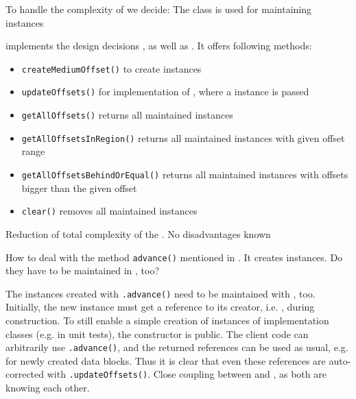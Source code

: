 To handle the complexity of \IMediumStore{} we decide:
{%
The class \MediumReferenceRepository{} is used for maintaining \IMediumReference{} instances
}
{%
\MediumReferenceRepository{} implements the design decisions ,  as well as . It offers following methods:
\begin{itemize}
\item \texttt{createMediumOffset()} to create \IMediumReference{} instances
\item \texttt{updateOffsets()} for implementation of , where a \MediumAction{} instance is passed
\item \texttt{getAllOffsets()} returns all maintained instances
\item \texttt{getAllOffsetsInRegion()} returns all maintained instances with given offset range
\item \texttt{getAllOffsetsBehindOrEqual()} returns all maintained instances with offsets bigger than the given offset
\item \texttt{clear()} removes all maintained instances
\end{itemize}

}
{%
Reduction of total complexity of the \IMediumStore{}.
}
{%
No disadvantages known
}

How to deal with the method \texttt{advance()} mentioned in . It creates \IMediumReference{} instances. Do they have to be maintained in \MediumReferenceRepository{}, too?

{%
The  \IMediumReference{} instances created with \IMediumReference{}\texttt{.advance()} need to be maintained with \MediumReferenceRepository{}, too.
}
{%
Initially, the new \IMediumReference{} instance must get a reference to its creator, i.e. \MediumReferenceRepository{}, during construction. To still enable a simple creation of instances of \IMediumReference{} implementation classes (e.g. in unit tests), the constructor is public.
}
{%
The client code can arbitrarily use \IMediumReference{}\texttt{.advance()}, and the returned references can be used as usual, e.g. for newly created data blocks. Thus it is clear that even these references are auto-corrected with \MediumReferenceRepository{}\texttt{.updateOffsets()}.
}
{%
Close coupling between \IMediumReference{} and \MediumReferenceRepository{}, as both are knowing each other.
}

